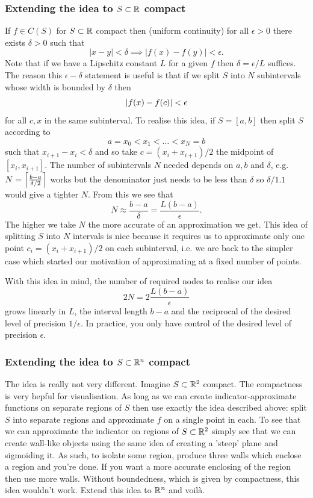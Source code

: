 \documentclass[11pt]{article}
\begin{document}
\subsubsection*{Extending the idea to $S\subset\mathbb{R}$ compact}
If $f\in C(S)$ for $S\subset\mathbb{R}$ compact then (uniform continuity) for all $\epsilon>0$ there exists $\delta>0$ such that
$$
|x-y|<\delta\implies|f(x)-f(y)|<\epsilon.
$$
Note that if we have a Lipschitz constant $L$ for a given $f$ then $\delta=\epsilon/L$ suffices. The reason this $\epsilon-\delta$ statement is useful is that if we split $S$ into $N$ subintervals whose width is bounded by $\delta$ then
$$
\left|f(x)-f(c)\right|<\epsilon
$$
for all $c,x$ in the same subinterval. To realise this idea, if $S=[a,b]$ then split $S$ according to
$$
a=x_0<x_1<\dots<x_N=b
$$
such that $x_{i+1}-x_i<\delta$ and so take $c=(x_i+x_{i+1})/2$ the midpoint of $[x_i,x_{i+1}]$. The number of subintervals $N$ needed depends on $a,b$ and $\delta$, e.g. $N=\left\lceil\frac{b-a}{\delta/2}\right\rceil$ works but the denominator just needs to be less than $\delta$ so $\delta/1.1$ would give a tighter $N$. From this we see that
$$
N
\approx
\frac{b-a}{\delta}
=
\frac{L(b-a)}{\epsilon}.
$$
The higher we take $N$ the more accurate of an approximation we get. This idea of splitting $S$ into $N$ intervals is nice because it requires us to approximate only one point $c_i=(x_i+x_{i+1})/2$ on each subinterval, i.e. we are back to the simpler case which started our motivation of approximating at a fixed number of points.

With this idea in mind, the number of required nodes to realise our idea
$$
2N
=
2\frac{L(b-a)}{\epsilon}
$$
grows linearly in $L$, the interval length $b-a$ and the reciprocal of the desired level of precision $1/\epsilon$. In practice, you only have control of the desired level of precision $\epsilon$.

\subsubsection*{Extending the idea to $S\subset\mathbb{R}^n$ compact}
The idea is really not very different. Imagine $S\subset\mathbb{R}^2$ compact. The compactness is very hepful for visualisation. As long as we can create indicator-approximate functions on separate regions of $S$ then use exactly the idea described above: split $S$ into separate regions and approximate $f$ on a single point in each. To see that we can approximate the indicator on regions of $S\subset\mathbb{R}^2$ simply see that we can create wall-like objects using the same idea of creating a 'steep' plane and sigmoiding it. As such, to isolate some region, produce three walls which enclose a region and you're done. If you want a more accurate enclosing of the region then use more walls. Without boundedness, which is given by compactness, this idea wouldn't work. Extend this idea to $\mathbb{R}^n$ and voilà.
\end{document}
